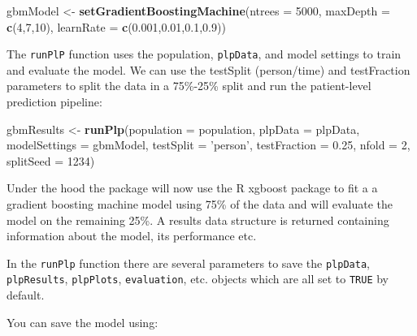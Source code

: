 \documentclass[]{book}
\newenvironment{Shaded}{\begin{snugshade}}{\end{snugshade}}
\newcommand{\KeywordTok}[1]{\textcolor[rgb]{0.13,0.29,0.53}{\textbf{#1}}}
\newcommand{\DataTypeTok}[1]{\textcolor[rgb]{0.13,0.29,0.53}{#1}}
\newcommand{\DecValTok}[1]{\textcolor[rgb]{0.00,0.00,0.81}{#1}}
\newcommand{\FloatTok}[1]{\textcolor[rgb]{0.00,0.00,0.81}{#1}}
\newcommand{\StringTok}[1]{\textcolor[rgb]{0.31,0.60,0.02}{#1}}
\newcommand{\OperatorTok}[1]{\textcolor[rgb]{0.81,0.36,0.00}{\textbf{#1}}}
\newcommand{\NormalTok}[1]{#1}
\begin{document}
\begin{Shaded}
\begin{Highlighting}[]
\NormalTok{gbmModel <-}\StringTok{ }\KeywordTok{setGradientBoostingMachine}\NormalTok{(}\DataTypeTok{ntrees =} \DecValTok{5000}\NormalTok{, }
                                       \DataTypeTok{maxDepth =} \KeywordTok{c}\NormalTok{(}\DecValTok{4}\NormalTok{,}\DecValTok{7}\NormalTok{,}\DecValTok{10}\NormalTok{), }
                                       \DataTypeTok{learnRate =} \KeywordTok{c}\NormalTok{(}\FloatTok{0.001}\NormalTok{,}\FloatTok{0.01}\NormalTok{,}\FloatTok{0.1}\NormalTok{,}\FloatTok{0.9}\NormalTok{))}
\end{Highlighting}
\end{Shaded}

The \texttt{runPlP} function uses the population, \texttt{plpData}, and
model settings to train and evaluate the model. We can use the testSplit
(person/time) and testFraction parameters to split the data in a
75\%-25\% split and run the patient-level prediction pipeline:

\begin{Shaded}
\begin{Highlighting}[]
\NormalTok{gbmResults <-}\StringTok{ }\KeywordTok{runPlp}\NormalTok{(}\DataTypeTok{population =}\NormalTok{ population, }
                     \DataTypeTok{plpData =}\NormalTok{ plpData, }
                     \DataTypeTok{modelSettings =}\NormalTok{ gbmModel, }
                     \DataTypeTok{testSplit =} \StringTok{'person'}\NormalTok{,}
                     \DataTypeTok{testFraction =} \FloatTok{0.25}\NormalTok{, }
                     \DataTypeTok{nfold =} \DecValTok{2}\NormalTok{, }
                     \DataTypeTok{splitSeed =} \DecValTok{1234}\NormalTok{)}
\end{Highlighting}
\end{Shaded}

Under the hood the package will now use the R xgboost package to fit a a
gradient boosting machine model using 75\% of the data and will evaluate
the model on the remaining 25\%. A results data structure is returned
containing information about the model, its performance etc.

In the \texttt{runPlp} function there are several parameters to save the
\texttt{plpData}, \texttt{plpResults}, \texttt{plpPlots},
\texttt{evaluation}, etc. objects which are all set to \texttt{TRUE} by
default.

You can save the model using:

\begin{Shaded}
\end{Shaded}
\end{document}
